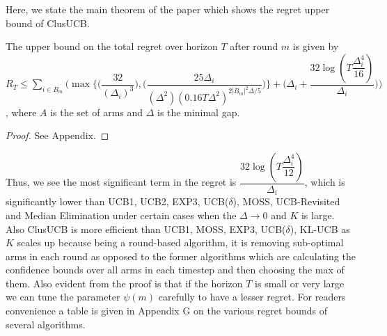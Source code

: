 	
	Here, we state the main theorem of the paper which shows the regret upper bound of ClusUCB.
	
\begin{theorem}
The upper bound on the total regret over horizon $T$ after round $m$ is given by 
$R_{T}\leq \sum_{i\in B_{m}}\bigg (\max{\bigg\lbrace \bigg(\dfrac{32}{(\Delta_{i})^{3}}\bigg) ,\bigg(\dfrac{25\Delta_{i}}{(\Delta^{2})(0.16T\Delta^{2})^{2|B_{m}|^{2}\Delta/5}}\bigg)\bigg\rbrace} + \bigg(\Delta_{i}+\dfrac{32\log{(T\dfrac{\Delta_{i}^{4}}{16})}}{\Delta_{i}}\bigg)\bigg)$, 
where $A$ is the set of arms and $\Delta$ is the minimal gap.
\end{theorem}

\begin{proof}
	See Appendix.
\end{proof}

\begin{remark}
	Thus, we see the most significant term in the regret is $\dfrac{32\log{(T\dfrac{\Delta_{i}^{4}}{12})}}{\Delta_{i}}$, which is significantly lower than UCB1, UCB2, EXP3, UCB($\delta$), MOSS, UCB-Revisited and Median Elimination under certain cases when the $\Delta \rightarrow 0$ and $K$ is large. Also ClusUCB is more efficient than UCB1, MOSS, EXP3, UCB($\delta$), KL-UCB as $K$ scales up because being a round-based algorithm, it is removing sub-optimal arms in each round as opposed to the former algorithms which are calculating the confidence bounds over all arms in each timestep and then choosing the max of them. Also evident from the proof is that if the horizon $T$ is small or very large we can tune the parameter $\psi(m)$ carefully to have a lesser regret. For readers convenience a table is given in Appendix G on the various regret bounds of several algorithms. 
\end{remark}	




